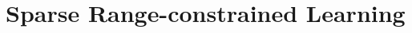 \documentclass[journal]{IEEEtran}
\begin{document}

        



\section{Sparse Range-constrained Learning}\label{SRL}

 
 
\end{document}
